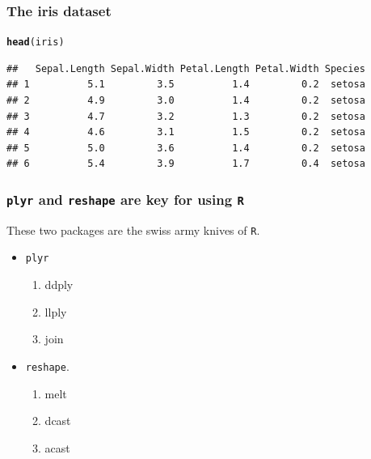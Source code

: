\documentclass{beamer}\usepackage[]{graphicx}\usepackage[]{color}
\makeatletter
\newcommand{\hlkwd}[1]{\textcolor[rgb]{0.737,0.353,0.396}{\textbf{#1}}}%
\newenvironment{kframe}{%
 \def\at@end@of@kframe{}%
 \ifinner\ifhmode%
  \def\at@end@of@kframe{\end{minipage}}%
  \begin{minipage}{\columnwidth}%
 \fi\fi%
 \def\FrameCommand##1{\hskip\@totalleftmargin \hskip-\fboxsep
 \colorbox{shadecolor}{##1}\hskip-\fboxsep
     \hskip-\linewidth \hskip-\@totalleftmargin \hskip\columnwidth}%
 \MakeFramed {\advance\hsize-\width
   \@totalleftmargin\z@ \linewidth\hsize
   \@setminipage}}%
 {\par\unskip\endMakeFramed%
 \at@end@of@kframe}
\newenvironment{knitrout}{}{} %
\makeatother
\begin{document}

\begin{frame}[fragile]
\frametitle{The iris dataset}
\begin{knitrout}\footnotesize
{}\color{fgcolor}\begin{kframe}
\begin{alltt}
\hlkwd{head}(iris)
\end{alltt}
\begin{verbatim}
##   Sepal.Length Sepal.Width Petal.Length Petal.Width Species
## 1          5.1         3.5          1.4         0.2  setosa
## 2          4.9         3.0          1.4         0.2  setosa
## 3          4.7         3.2          1.3         0.2  setosa
## 4          4.6         3.1          1.5         0.2  setosa
## 5          5.0         3.6          1.4         0.2  setosa
## 6          5.4         3.9          1.7         0.4  setosa
\end{verbatim}
\end{kframe}
\end{knitrout}

\end{frame}


\begin{frame}[fragile]
    \frametitle{\texttt{plyr} and \texttt{reshape} are key for using \texttt{R}}
    These two packages are the swiss army knives of \texttt{R}.
\begin{itemize}
\item \texttt{plyr}
    \begin{enumerate}
    \item ddply
    \item llply
    \item join
    \end{enumerate}
\item \texttt{reshape}.
    \begin{enumerate}
    \item melt
    \item dcast
    \item acast
    \end{enumerate}
\end{itemize}
\end{frame}

\end{document}
